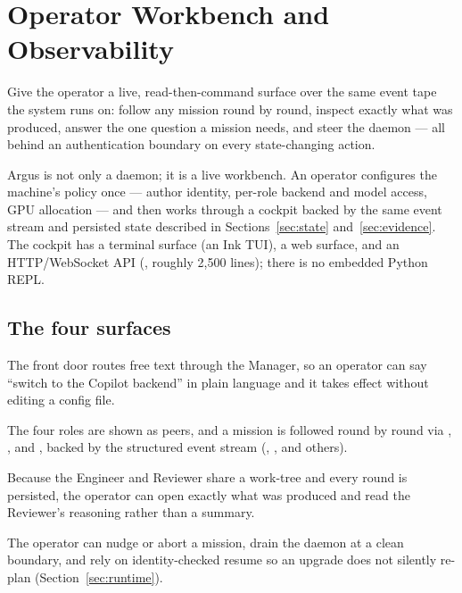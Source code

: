 \section{Operator Workbench and Observability}
\label{sec:workbench}

\begin{designbox}
Give the operator a live, read-then-command surface over the same event tape the
system runs on: follow any mission round by round, inspect exactly what was
produced, answer the one question a mission needs, and steer the daemon --- all
behind an authentication boundary on every state-changing action.
\end{designbox}

Argus is not only a daemon; it is a live workbench. An operator configures the
machine's policy once --- author identity, per-role backend and model access, GPU
allocation --- and then works through a cockpit backed by the same event stream and
persisted state described in Sections~\ref{sec:state} and~\ref{sec:evidence}. The
cockpit has a terminal surface (an Ink TUI), a web surface, and an HTTP/WebSocket
API (, roughly 2{,}500 lines); there is no embedded
Python REPL.

\subsection{The four surfaces}

\begin{description}[leftmargin=1.4em, style=nextline]
  \item[Cockpit.] The front door routes free text through the Manager, so an
    operator can say ``switch to the Copilot backend'' in plain language and it
    takes effect without editing a config file.
  \item[Mission view.] The four roles are shown as peers, and a mission is followed
    round by round via , , and , backed
    by the structured event stream (,
    , and others).
  \item[Inspectable artifacts.] Because the Engineer and Reviewer share a work-tree
    and every round is persisted, the operator can open exactly what was produced
    and read the Reviewer's reasoning rather than a summary.
  \item[Intervention.] The operator can nudge or abort a mission, drain the daemon
    at a clean boundary, and rely on identity-checked resume so an upgrade does not
    silently re-plan (Section~\ref{sec:runtime}).
\end{description}

